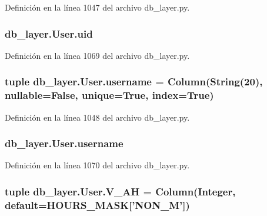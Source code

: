 Definición en la línea 1047 del archivo db\-\_\-layer.\-py.

\hypertarget{classdb__layer_1_1_user_a6dd94ba7a77cae42cef41f5f96c01350}{
\subsubsection[{uid}]{\setlength{\rightskip}{0pt plus 5cm}db\-\_\-layer.\-User.\-uid}}\label{classdb__layer_1_1_user_a6dd94ba7a77cae42cef41f5f96c01350}


Definición en la línea 1069 del archivo db\-\_\-layer.\-py.

\hypertarget{classdb__layer_1_1_user_a096c898547257a09c296dd25a6625ff0}{
\subsubsection[{username}]{\setlength{\rightskip}{0pt plus 5cm}tuple db\-\_\-layer.\-User.\-username = Column(String(20), nullable=False, unique=True, index=True)\hspace{0.3cm}{\ttfamily [static]}}}\label{classdb__layer_1_1_user_a096c898547257a09c296dd25a6625ff0}


Definición en la línea 1048 del archivo db\-\_\-layer.\-py.

\hypertarget{classdb__layer_1_1_user_a9c0caa7abefdca0584f2a1420afcab3c}{
\subsubsection[{username}]{\setlength{\rightskip}{0pt plus 5cm}db\-\_\-layer.\-User.\-username}}\label{classdb__layer_1_1_user_a9c0caa7abefdca0584f2a1420afcab3c}


Definición en la línea 1070 del archivo db\-\_\-layer.\-py.

\hypertarget{classdb__layer_1_1_user_a52dcce70c5f6169a4edec3033868281c}{
\subsubsection[{V\-\_\-\-A\-H}]{\setlength{\rightskip}{0pt plus 5cm}tuple db\-\_\-layer.\-User.\-V\-\_\-\-A\-H = Column(Integer, default={\bf H\-O\-U\-R\-S\-\_\-\-M\-A\-S\-K}\mbox{[}'N\-O\-N\-\_\-\-M'\mbox{]})\hspace{0.3cm}{\ttfamily [static]}}}\label{classdb__layer_1_1_user_a52dcce70c5f6169a4edec3033868281c}


